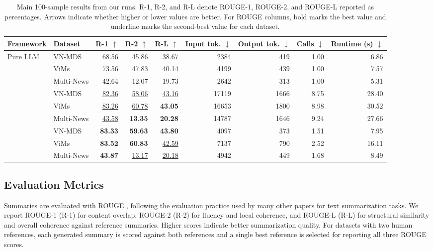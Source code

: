 \documentclass[11pt]{article}
\newcommand{\methodname}{\textsc{SHESum}}
\begin{document}
\begin{table}[t]
\centering
\small
\setlength{\tabcolsep}{4pt}
\begin{tabular*}{\textwidth}{@{\extracolsep{\fill}}llrrrrrrr@{}}
\toprule
Framework & Dataset & R-1 $\uparrow$ & R-2 $\uparrow$ & R-L $\uparrow$ & Input tok. $\downarrow$ & Output tok. $\downarrow$ & Calls $\downarrow$ & Runtime (s) $\downarrow$ \\
\midrule
\multirow{3}{*}{Pure LLM} & VN-MDS & 68.56 & 45.86 & 38.67 & 2384 & 419 & 1.00 & 6.86 \\
 & ViMs & 73.56 & 47.83 & 40.14 & 4199 & 439 & 1.00 & 7.57 \\
 & Multi-News & 42.64 & 12.07 & 19.73 & 2642 & 313 & 1.00 & 5.31 \\
\addlinespace
\multirow{3}{*}{MoA (\citeyear{tuan-2026-moa})} & VN-MDS & \underline{82.36} & \underline{58.06} & \underline{43.16} & 17119 & 1666 & 8.75 & 28.40 \\
 & ViMs & \underline{83.26} & \underline{60.78} & \textbf{43.05} & 16653 & 1800 & 8.98 & 30.52 \\
 & Multi-News & \underline{43.58} & \textbf{13.35} & \textbf{20.28} & 14787 & 1646 & 9.24 & 27.66 \\
\addlinespace
\multirow{3}{*}{\textbf{\methodname{}(Ours)}} & VN-MDS & \textbf{83.33} & \textbf{59.63} & \textbf{43.80} & 4097 & 373 & 1.51 & 7.95 \\
 & ViMs & \textbf{83.52} & \textbf{60.83} & \underline{42.59} & 7137 & 790 & 2.52 & 16.11 \\
 & Multi-News & \textbf{43.87} & \underline{13.17} & \underline{20.18} & 4942 & 449 & 1.68 & 8.49 \\
\bottomrule
\end{tabular*}
\caption{Main 100-sample results from our runs. R-1, R-2, and R-L denote ROUGE-1, ROUGE-2, and ROUGE-L reported as percentages. Arrows indicate whether higher or lower values are better. For ROUGE columns, bold marks the best value and underline marks the second-best value for each dataset.}
\label{tab:main-results}
\end{table}

\subsection{Evaluation Metrics}

Summaries are evaluated with ROUGE \citep{lin-2004-rouge}, following the evaluation practice used by many other papers for text summarization tasks. We report ROUGE-1 (R-1) for content overlap, ROUGE-2 (R-2) for fluency and local coherence,
and ROUGE-L (R-L) for structural similarity and overall coherence against reference summaries. Higher scores indicate better summarization quality. For datasets with two human references, each generated summary is scored against both references and a single best reference is selected for reporting all three ROUGE scores.
\end{document}
